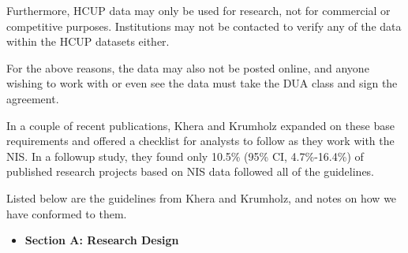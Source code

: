 Furthermore, HCUP data may only be used for research, not for commercial or competitive purposes. Institutions may not be contacted
to verify any of the data within the HCUP datasets either. 

For the above reasons, the data may also not be posted online, and anyone wishing to work with or even see the data must take the DUA class and
sign the agreement. \cite{HCUPDUA}

In a couple of recent publications, Khera and Krumholz expanded on these base requirements and offered a checklist \cite{Krumholz2017} 
for analysts to follow as they work with the NIS. In a followup study, they found only 10.5\% (95\% CI, 4.7\%-16.4\%) of published research
projects based on NIS data followed all of the guidelines. \cite{Khera2017}

Listed below are the guidelines from Khera and Krumholz, and notes on how we have conformed to them.


\begin{itemize}
  \item  \textbf{Section A: Research Design}
\end{itemize}


